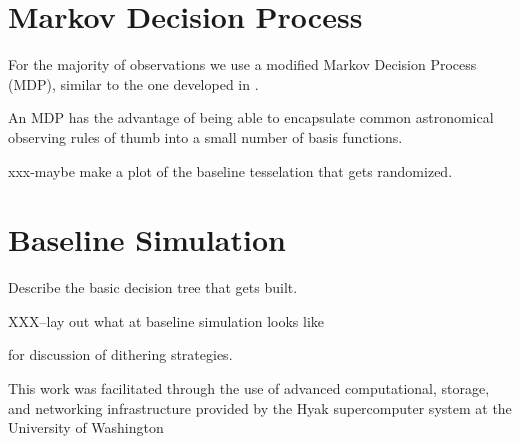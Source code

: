 \documentclass[]{aastex631}
\begin{document}
\section{Markov Decision Process}

For the majority of observations we use a modified Markov Decision Process (MDP), similar to the one developed in \citet{Naghib2019}.

An MDP has the advantage of being able to encapsulate common astronomical observing rules of thumb into a small number of basis functions. 


xxx-maybe make a plot of the baseline tesselation that gets randomized. 

\section{Baseline Simulation}

Describe the basic decision tree that gets built. 


XXX--lay out what at baseline simulation looks like


\citet{Awan2016} for discussion of dithering strategies. 

          
{}


\begin{acknowledgments}
This work was facilitated through the use of advanced computational, storage, and networking infrastructure provided by the Hyak supercomputer system at the University of Washington
\end{acknowledgments}
\end{document}
